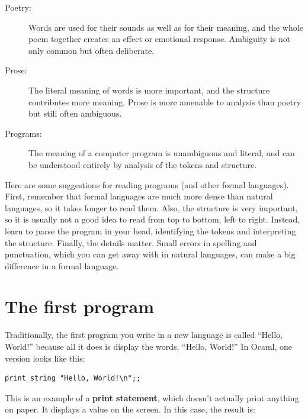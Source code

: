 \documentclass[10pt]{book}
\begin{document}

\begin{description}

\item[Poetry:] Words are used for their sounds as well as for their meaning, and the whole poem 
together creates an effect or emotional response.  Ambiguity is not only common but often deliberate.

\item[Prose:] The literal meaning of words is more important, and the structure contributes more 
meaning.  Prose is more amenable to analysis than poetry but still often ambiguous.

\item[Programs:] The meaning of a computer program is unambiguous and literal, and can be understood 
entirely by analysis of the tokens and structure.

\end{description}

Here are some suggestions for reading programs (and other formal languages).  First, remember that 
formal languages are much more dense than natural languages, so it takes longer to read them.  Also, 
the structure is very important, so it is usually not a good idea to read from top to bottom, left 
to right.  Instead, learn to parse the program in your head, identifying the tokens and interpreting 
the structure.  Finally, the details matter.  Small errors in spelling and punctuation, which you can 
get away with in natural languages, can make a big difference in a formal language.

\section{The first program}
\label{hello}


Traditionally, the first program you write in a new language is called ``Hello, World!'' 
because all it does is display the words, ``Hello, World!''  In Ocaml, one version looks 
like this:

\beforeverb
\begin{verbatim}
print_string "Hello, World!\n";;
\end{verbatim}
\afterverb

This is an example of a {\bf print statement}, which doesn't actually print anything on paper. 
It displays a value on the screen.  In this case, the result is:
\end{document}
